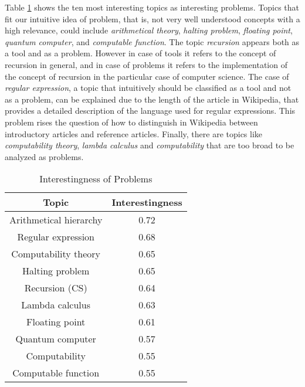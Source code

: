 Table \ref{tab:Interestingness-of-Problems} shows the ten most interesting
topics as interesting problems. Topics that fit our intuitive idea
of problem, that is, not very well understood concepts with a high
relevance, could include \emph{arithmetical theory}, \emph{halting
problem}, \emph{floating point}, \emph{quantum computer}, and \emph{computable
function}. The topic \emph{recursion} appears both as a tool and as
a problem. However in case of tools it refers to the concept of recursion
in general, and in case of problems it refers to the implementation
of the concept of recursion in the particular case of computer science.
The case of \emph{regular expression}, a topic that intuitively should
be classified as a tool and not as a problem, can be explained due
to the length of the article in Wikipedia, that provides a detailed
description of the language used for regular expressions. This problem
rises the question of how to distinguish in Wikipedia between introductory
articles and reference articles. Finally, there are topics like \emph{computability
theory}, \emph{lambda calculus} and \emph{computability} that are
too broad to be analyzed as problems.

\begin{table}
\begin{centering}
\begin{tabular}{|c|c|}
\hline 
Topic & Interestingness\tabularnewline
\hline 
\hline 
Arithmetical hierarchy & 0.72\tabularnewline
\hline 
Regular expression & 0.68\tabularnewline
\hline 
Computability theory & 0.65\tabularnewline
\hline 
Halting problem & 0.65\tabularnewline
\hline 
Recursion (CS) & 0.64\tabularnewline
\hline 
Lambda calculus & 0.63\tabularnewline
\hline 
Floating point & 0.61\tabularnewline
\hline 
Quantum computer & 0.57\tabularnewline
\hline 
Computability & 0.55\tabularnewline
\hline 
Computable function & 0.55\tabularnewline
\hline 
\end{tabular}
\par\end{centering}

\caption{\label{tab:Interestingness-of-Problems}Interestingness of Problems}
\end{table}

